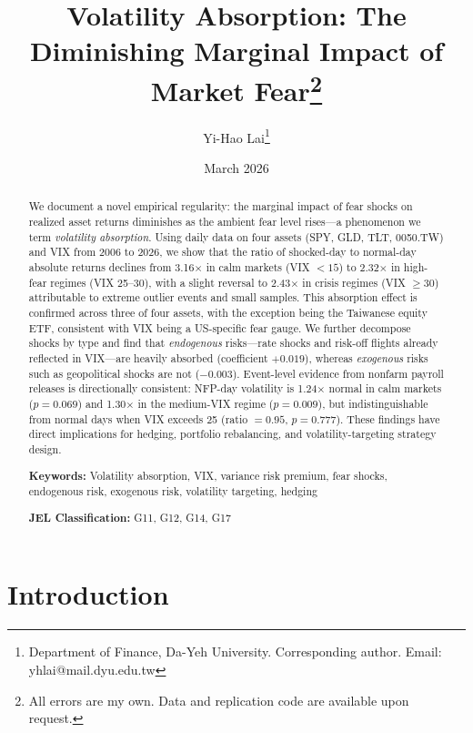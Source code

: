 \documentclass[12pt,a4paper]{article}
\title{Volatility Absorption: The Diminishing Marginal Impact of Market Fear\thanks{All errors are my own. Data and replication code are available upon request.}}
\author{Yi-Hao Lai\thanks{Department of Finance, Da-Yeh University. Corresponding author. Email: yhlai@mail.dyu.edu.tw}}
\date{March 2026}
\begin{document}
\maketitle

\begin{abstract}
\noindent
We document a novel empirical regularity: the marginal impact of fear shocks on realized asset returns diminishes as the ambient fear level rises---a phenomenon we term \textit{volatility absorption}. Using daily data on four assets (SPY, GLD, TLT, 0050.TW) and VIX from 2006 to 2026, we show that the ratio of shocked-day to normal-day absolute returns declines from 3.16$\times$ in calm markets (VIX $< 15$) to 2.32$\times$ in high-fear regimes (VIX 25--30), with a slight reversal to 2.43$\times$ in crisis regimes (VIX $\geq 30$) attributable to extreme outlier events and small samples. This absorption effect is confirmed across three of four assets, with the exception being the Taiwanese equity ETF, consistent with VIX being a US-specific fear gauge. We further decompose shocks by type and find that \textit{endogenous} risks---rate shocks and risk-off flights already reflected in VIX---are heavily absorbed (coefficient $+0.019$), whereas \textit{exogenous} risks such as geopolitical shocks are not ($-0.003$). Event-level evidence from nonfarm payroll releases is directionally consistent: NFP-day volatility is 1.24$\times$ normal in calm markets ($p = 0.069$) and 1.30$\times$ in the medium-VIX regime ($p = 0.009$), but indistinguishable from normal days when VIX exceeds 25 (ratio $= 0.95$, $p = 0.777$). These findings have direct implications for hedging, portfolio rebalancing, and volatility-targeting strategy design.

\medskip
\noindent
\textbf{Keywords:} Volatility absorption, VIX, variance risk premium, fear shocks, endogenous risk, exogenous risk, volatility targeting, hedging

\medskip
\noindent
\textbf{JEL Classification:} G11, G12, G14, G17
\end{abstract}

\newpage
\tableofcontents
\newpage

\section{Introduction}
\label{sec:intro}
\end{document}
